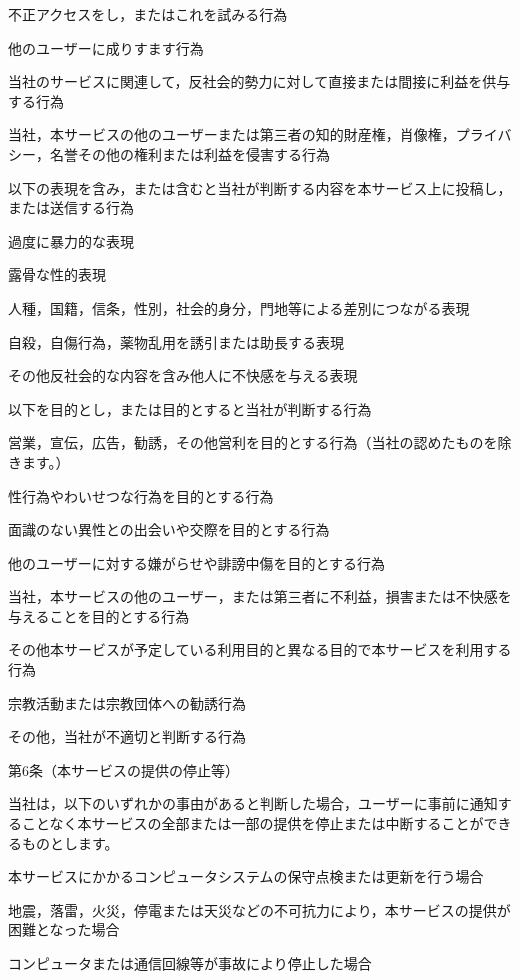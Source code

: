     不正アクセスをし，またはこれを試みる行為

    他のユーザーに成りすます行為

    当社のサービスに関連して，反社会的勢力に対して直接または間接に利益を供与する行為

    当社，本サービスの他のユーザーまたは第三者の知的財産権，肖像権，プライバシー，名誉その他の権利または利益を侵害する行為

    以下の表現を含み，または含むと当社が判断する内容を本サービス上に投稿し，または送信する行為 

        過度に暴力的な表現

        露骨な性的表現

        人種，国籍，信条，性別，社会的身分，門地等による差別につながる表現

        自殺，自傷行為，薬物乱用を誘引または助長する表現

        その他反社会的な内容を含み他人に不快感を与える表現

    以下を目的とし，または目的とすると当社が判断する行為

        営業，宣伝，広告，勧誘，その他営利を目的とする行為（当社の認めたものを除きます。）

        性行為やわいせつな行為を目的とする行為

        面識のない異性との出会いや交際を目的とする行為

        他のユーザーに対する嫌がらせや誹謗中傷を目的とする行為

        当社，本サービスの他のユーザー，または第三者に不利益，損害または不快感を与えることを目的とする行為

        その他本サービスが予定している利用目的と異なる目的で本サービスを利用する行為

    宗教活動または宗教団体への勧誘行為

    その他，当社が不適切と判断する行為

第6条（本サービスの提供の停止等）

    当社は，以下のいずれかの事由があると判断した場合，ユーザーに事前に通知することなく本サービスの全部または一部の提供を停止または中断することができるものとします。

        本サービスにかかるコンピュータシステムの保守点検または更新を行う場合

        地震，落雷，火災，停電または天災などの不可抗力により，本サービスの提供が困難となった場合

        コンピュータまたは通信回線等が事故により停止した場合

